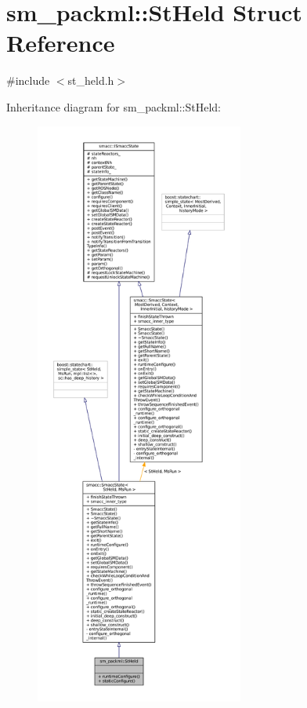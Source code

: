 \hypertarget{structsm__packml_1_1StHeld}{}\section{sm\+\_\+packml\+:\+:St\+Held Struct Reference}
\label{structsm__packml_1_1StHeld}


{\ttfamily \#include $<$st\+\_\+held.\+h$>$}



Inheritance diagram for sm\+\_\+packml\+:\+:St\+Held\+:
\nopagebreak
\begin{figure}[H]
\begin{center}
\leavevmode
\includegraphics[height=550pt]{structsm__packml_1_1StHeld__inherit__graph}
\end{center}
\end{figure}


